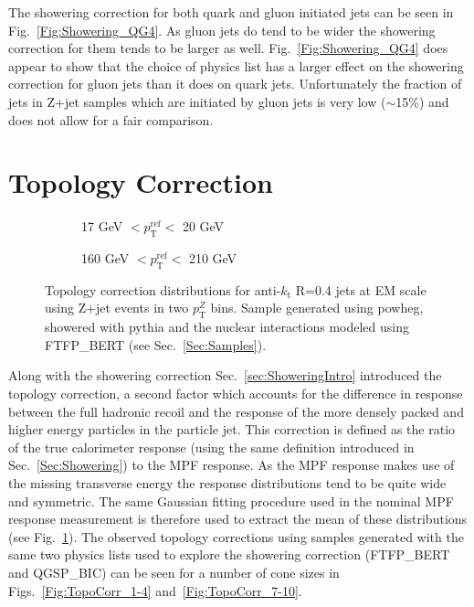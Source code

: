 The showering correction for both quark and gluon initiated jets can be seen in Fig.~\ref{Fig:Showering_QG4}.  
As gluon jets do tend to be wider the showering correction for them tends to be larger as well.  
Fig.~\ref{Fig:Showering_QG4} does appear to show that the choice of physics list has a larger effect on the showering correction for gluon jets than it does on quark jets.  
Unfortunately the fraction of jets in Z+jet samples which are initiated by gluon jets is very low ($\sim$15\%) and does not allow for a fair comparison.   


\section{Topology Correction}

\begin{figure}[!ht]
  \centering
  \begin{subfigure}{.5\textwidth}
    \centering
    \caption{17 GeV $< p_{\mathrm{T}}^{\mathrm{ref}} < $ 20 GeV}
  \end{subfigure}%
  \begin{subfigure}{.5\textwidth}  \centering
    \caption{160 GeV $< p_{\mathrm{T}}^{\mathrm{ref}} < $ 210 GeV}
  \end{subfigure}
 \caption[Example topology correction distributions]
 {\small Topology correction distributions for anti-$k_{\mathrm t}$ R=0.4 jets at EM scale using Z+jet events in two $p_{\mathrm T}^Z$ bins.  Sample generated using {\sc powheg}, showered with {\sc pythia} and the nuclear interactions modeled using FTFP\_BERT (see Sec.~\ref{Sec:Samples}).   }
 \label{Fig:TopologyDistExample}
\end{figure}

Along with the showering correction Sec.~\ref{sec:ShoweringIntro} introduced the topology correction, a second factor which accounts for the difference in response between the full hadronic recoil and the response of the more densely packed and higher energy particles in the particle jet.  
This correction is defined as the ratio of the true calorimeter response (using the same definition introduced in Sec.~\ref{Sec:Showering}) to the MPF response.  
As the MPF response makes use of the missing transverse energy the response distributions tend to be quite wide and symmetric.  
The same Gaussian fitting procedure used in the nominal MPF response measurement is therefore used to extract the mean of these distributions (see Fig.~\ref{Fig:TopologyDistExample}).  
The observed topology corrections using samples generated with the same two physics lists used to explore the showering correction (FTFP\_BERT and QGSP\_BIC) can be seen for a number of cone sizes in Figs.~\ref{Fig:TopoCorr_1-4} and~\ref{Fig:TopoCorr_7-10}.  

